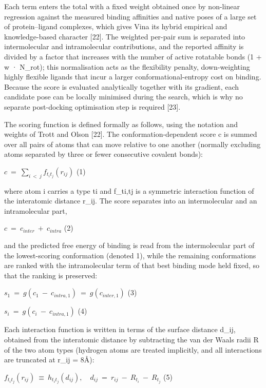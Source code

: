 Each term enters the total with a fixed weight obtained once by non-linear regression against the measured binding affinities and native poses of a large set of protein--ligand complexes, which gives Vina its hybrid empirical and knowledge-based character {[}22{]}. The weighted per-pair sum is separated into intermolecular and intramolecular contributions, and the reported affinity is divided by a factor that increases with the number of active rotatable bonds (1 + w · N\_rot); this normalisation acts as the flexibility penalty, down-weighting highly flexible ligands that incur a larger conformational-entropy cost on binding. Because the score is evaluated analytically together with its gradient, each candidate pose can be locally minimised during the search, which is why no separate post-docking optimisation step is required {[}23{]}.

The scoring function is defined formally as follows, using the notation and weights of Trott and Olson {[}22{]}. The conformation-dependent score c is summed over all pairs of atoms that can move relative to one another (normally excluding atoms separated by three or fewer consecutive covalent bonds):

\(c\  = \ \sum_{i\  < \ j}^{}{f_{t_{i}t_{j}}\left( r_{ij} \right)}\) (1)

where atom i carries a type ti and f\_ti,tj is a symmetric interaction function of the interatomic distance r\_ij. The score separates into an intermolecular and an intramolecular part,

\(c\  = \ c_{inter}\  + \ c_{intra}\) (2)

and the predicted free energy of binding is read from the intermolecular part of the lowest-scoring conformation (denoted 1), while the remaining conformations are ranked with the intramolecular term of that best binding mode held fixed, so that the ranking is preserved:

\(s_{1}\  = \ g\left( c_{1}\  - \ c_{intra,1} \right)\  = \ g\left( c_{inter,1} \right)\) (3)

\(s_{i}\  = \ g\left( c_{i}\  - \ c_{intra,1} \right)\) (4)

Each interaction function is written in terms of the surface distance d\_ij, obtained from the interatomic distance by subtracting the van der Waals radii R of the two atom types (hydrogen atoms are treated implicitly, and all interactions are truncated at r\_ij = 8Å):

\(f_{t_{i}t_{j}}\left( r_{ij} \right)\  \equiv \ h_{t_{i}t_{j}}\left( d_{ij} \right),\quad d_{ij}\  = \ r_{ij}\  - \ R_{t_{i}}\  - \ R_{t_{j}}\) (5)

